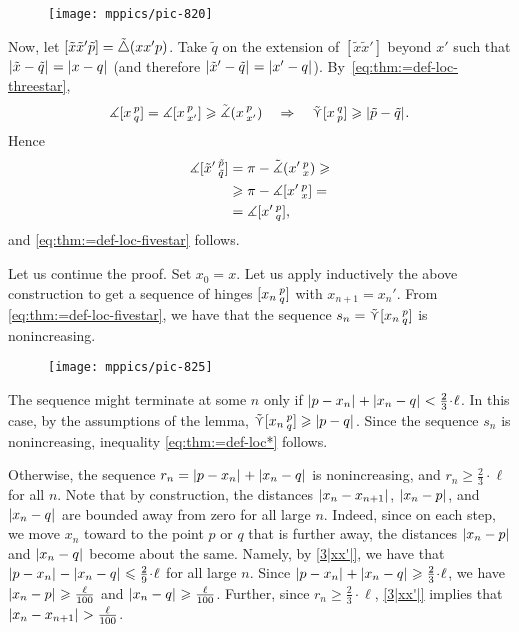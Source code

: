 {

\begin{wrapfigure}{r}{30 mm}
\vskip-0mm
\centering
\texttt{[image: mppics/pic-820]}
\vskip-4mm
\end{wrapfigure}

Now, let 
$[\tilde x\tilde x'\tilde p]=\tilde\triangle(x x' p)$.
Take $\tilde  q$ on the extension of $[\tilde  x\tilde  x']$ beyond $x'$ such that $\dist{\tilde x}{\tilde q}{}\z=\dist{x}{q}{}$ (and therefore $\dist{\tilde x'}{\tilde q}{}=\dist{x'}{q}{}$).
By~\ref{eq:thm:=def-loc-threestar},
\[\mangle\hinge x p q
=\mangle\hinge  x p{x'}\ge\angk x p{x'}\quad \Rightarrow\quad 
\side \hinge x q p\ge\dist{\tilde p}{\tilde q}{}.\]
Hence
\begin{align*}
\measuredangle[\tilde x'\,{}^{\tilde p}_{\tilde q}]&= 
\pi
-\tilde\measuredangle(x'\,{}^{p}_{x})
\geqslant
\\
&\geqslant
\pi-\measuredangle[x'\,{}^{p}_{x}]
=
\\
&=
\measuredangle[x'\,{}^{p}_{q}],
\end{align*}
and \ref{eq:thm:=def-loc-fivestar} follows.

}

\medskip

Let us continue the proof.
Set $x_0=x$.
Let us apply inductively the above construction to get a sequence of hinges  $[x_n\,{}^{p}_{q}]$ with $x_{n+1}=x_n'$.
From \ref{eq:thm:=def-loc-fivestar}, we have that the sequence  $s_n\z=\side \hinge{x_n}p q$ is nonincreasing.
\begin{figure}[ht!]
\centering
\texttt{[image: mppics/pic-825]}
\end{figure}

The sequence might terminate at some $n$ only if $\dist{p}{x_n}{}+\dist{x_n}{q}{}\z< \tfrac{2}{3}\cdot\ell $.
In this case, by the assumptions of the lemma, $\side \hinge{x_n}p q\ge\dist{p}{q}{}$.
Since the sequence $s_n$ is nonincreasing, inequality \ref{eq:thm:=def-loc*} follows.

Otherwise, the sequence $r_n=\dist{p}{x_n}{}+\dist{x_n}{q}{}$ is nonincreasing, and $r_n\ge\tfrac{2}{3}\cdot\ell$ for all $n$.
Note that by construction, the distances
$\dist{x_n}{x_{n+1}}{}$, $\dist{x_n}{p}{}$, and $\dist{x_n}{q}{}$ are bounded away from zero for all large $n$.
Indeed, since on each step, we move $x_n$ toward to the point $p$ or $q$ that is further away, the distances $\dist{x_n}{p}{}$ and $\dist{x_n}{q}{}$ become about the same.
Namely, by \ref{3|xx'|}, we have that $\dist{p}{x_n}{}-\dist{x_n}{q}{}\le \tfrac29\cdot\ell$ for all large $n$.
Since $\dist{p}{x_n}{}+\dist{x_n}{q}{}\ge \tfrac23\cdot\ell$, we have $\dist{x_n}{p}{}\ge \tfrac\ell{100}$ and $\dist{x_n}{q}{}\ge \tfrac\ell{100}$.
Further, since $r_n\ge\tfrac{2}{3}\cdot\ell$, \ref{3|xx'|} implies that $\dist{x_n}{x_{n+1}}{}>\tfrac\ell{100}$.


